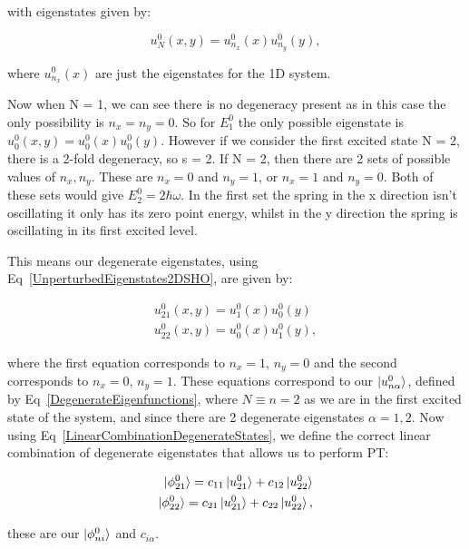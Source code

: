 \noindent with eigenstates given by:

\begin{equation}
    u^0_N(x, y) = u^0_{n_x}(x)u^0_{n_y}(y),
    \label{UnperturbedEigenstates2DSHO}
\end{equation}

\noindent where $u^0_{n_x}(x)$ are just the eigenstates for the 1D system.

\noindent Now when N = 1, we can see there is no degeneracy present as in this case the only possibility is $n_x = n_y = 0$. So for $E^0_1$ the only possible eigenstate is $u^0_0 (x, y) = u^0_0(x)u^0_0(y)$. However if we consider the first excited state N = 2, there is a 2-fold degeneracy, so s = 2. If N = 2, then there are 2 sets of possible values of $n_x, n_y$. These are $n_x = 0$ and $n_y = 1$, or $n_x = 1$ and $n_y = 0$. Both of these sets would give $E^0_2 = 2\hbar \omega$. In the first set the spring in the x direction isn't oscillating it only has its zero point energy, whilst in the y direction the spring is oscillating in its first excited level.

\noindent This means our degenerate eigenstates, using Eq~\ref{UnperturbedEigenstates2DSHO}, are given by:

\begin{eqnarray}
    u^0_{21}(x, y) = u^0_1(x)u^0_0(y) \\
    u^0_{22}(x, y) = u^0_0(x)u^0_1(y),
    \label{DegenerateWavefunctions2DSHO}
\end{eqnarray}

\noindent where the first equation corresponds to $n_x = 1$, $n_y = 0$ and the second corresponds to $n_x = 0$, $n_y = 1$. These equations correspond to our $\ket{u^0_{n\alpha}}$, defined by Eq~\ref{DegenerateEigenfunctions}, where $N \equiv n = 2$ as we are in the first excited state of the system, and since there are 2 degenerate eigenstates $\alpha = 1, 2$. Now using Eq~\ref{LinearCombinationDegenerateStates}, we define the correct linear combination of degenerate eigenstates that allows us to perform PT:

\begin{eqnarray}
    \ket{\phi^0_{21}} = c_{11}\ket{u^0_{21}} + c_{12}\ket{u^0_{22}} \label{LinearCombinationDegenerateStates2DSHO_1} \\
    \ket{\phi^0_{22}} = c_{21}\ket{u^0_{21}} + c_{22}\ket{u^0_{22}},
    \label{LinearCombinationDegenerateStates2DSHO_2}
\end{eqnarray}

\noindent these are our $\ket{\phi^0_{ni}}$ and $c_{i\alpha}$.

